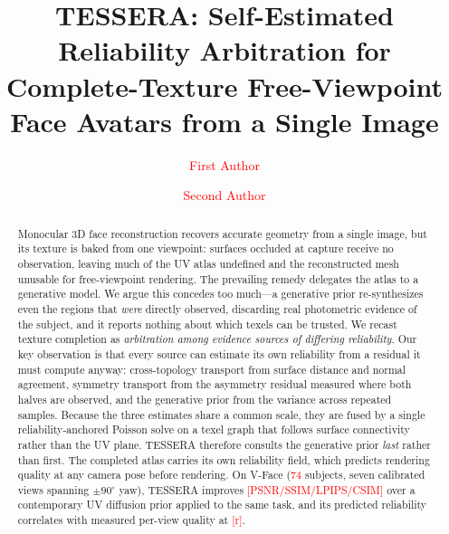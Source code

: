\documentclass[runningheads]{llncs}
\newcommand{\PH}[1]{\textcolor{red}{#1}}
\begin{document}
\title{TESSERA: Self-Estimated Reliability Arbitration for
Complete-Texture Free-Viewpoint Face Avatars from a Single Image}

\author{\PH{First Author} \and \PH{Second Author}}
\authorrunning{\PH{F. Author et al.}}
\institute{\PH{Affiliation, City, Country}\\
\email{\PH{email@domain}}}

\maketitle


\begin{abstract}
Monocular 3D face reconstruction recovers accurate geometry from a single
image, but its texture is baked from one viewpoint: surfaces occluded at
capture receive no observation, leaving much of the UV atlas undefined and the
reconstructed mesh unusable for free-viewpoint rendering. The prevailing remedy
delegates the atlas to a generative model. We argue this concedes too much---a
generative prior re-synthesizes even the regions that \emph{were} directly
observed, discarding real photometric evidence of the subject, and it reports
nothing about which texels can be trusted.
We recast texture completion as \emph{arbitration among evidence sources of
differing reliability}. Our key observation is that every source can estimate
its own reliability from a residual it must compute anyway: cross-topology
transport from surface distance and normal agreement, symmetry transport from
the asymmetry residual measured where both halves are observed, and the
generative prior from the variance across repeated samples. Because the three
estimates share a common scale, they are fused by a single reliability-anchored
Poisson solve on a texel graph that follows surface connectivity rather than the
UV plane. TESSERA therefore consults the generative prior \emph{last} rather
than first.
The completed atlas carries its own reliability field, which predicts rendering
quality at any camera pose before rendering. On V-Face
(\PH{74} subjects, seven calibrated views spanning $\pm90^\circ$ yaw), TESSERA
improves \PH{[PSNR/SSIM/LPIPS/CSIM]} over a contemporary UV diffusion prior
applied to the same task, and its predicted reliability correlates with measured
per-view quality at \PH{[r]}.
\end{abstract}
\end{document}
